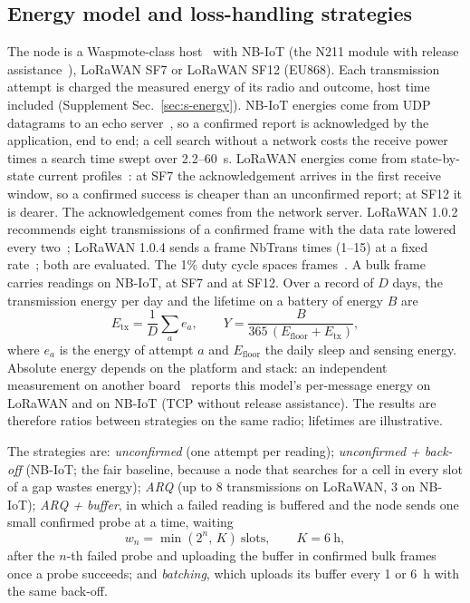 \subsection{Energy model and loss-handling strategies}
\label{sec:data-energy}
The node is a Waspmote-class host~\cite{libelium2020plugsense} with NB-IoT (the N211 module with release assistance~\cite{michelinakis2021dissecting}), LoRaWAN SF7 or LoRaWAN SF12 (EU868). Each transmission attempt is charged the measured energy of its radio and outcome, host time included (Supplement Sec.~\ref{sec:s-energy}). NB-IoT energies come from UDP datagrams to an echo server~\cite{michelinakis2021dissecting}, so a confirmed report is acknowledged by the application, end to end; a cell search without a network costs the receive power~\cite{sorensen2022nbiot} times a search time swept over 2.2--60~s. LoRaWAN energies come from state-by-state current profiles~\cite{casals2017lorawan}: at SF7 the acknowledgement arrives in the first receive window, so a confirmed success is cheaper than an unconfirmed report; at SF12 it is dearer. The acknowledgement comes from the network server. LoRaWAN 1.0.2 recommends eight transmissions of a confirmed frame with the data rate lowered every two~\cite{lora2016spec102}; LoRaWAN 1.0.4 sends a frame NbTrans times (1--15) at a fixed rate~\cite{lora2020spec104}; both are evaluated. The 1\% duty cycle spaces frames~\cite{lora2021rp002}. A bulk frame carries \rpfNb{} readings on NB-IoT, \rpfSfSeven{} at SF7 and \rpfSfTwelve{} at SF12. Over a record of $D$ days, the transmission energy per day and the lifetime on a battery of energy $B$ are
\begin{equation}
E_\mathrm{tx}=\frac{1}{D}\sum_{a} e_a,\qquad Y=\frac{B}{365\,(E_\mathrm{floor}+E_\mathrm{tx})},
\label{eq:energy}
\end{equation}
where $e_a$ is the energy of attempt $a$ and $E_\mathrm{floor}$ the daily sleep and sensing energy. Absolute energy depends on the platform and stack: an independent measurement on another board~\cite{ugwuanyi2021developing} reports \ugwLoraRatio{} this model's per-message energy on LoRaWAN and \ugwNbRatio{} on NB-IoT (TCP without release assistance). The results are therefore ratios between strategies on the same radio; lifetimes are illustrative.

The strategies are: \emph{unconfirmed} (one attempt per reading); \emph{unconfirmed + back-off} (NB-IoT; the fair baseline, because a node that searches for a cell in every slot of a gap wastes energy); \emph{ARQ} (up to 8 transmissions on LoRaWAN, 3 on NB-IoT); \emph{ARQ + buffer}, in which a failed reading is buffered and the node sends one small confirmed probe at a time, waiting
\begin{equation}
w_n=\min\left(2^{n},\,K\right)\ \text{slots},\qquad K=6~\text{h},
\label{eq:backoff}
\end{equation}
after the $n$-th failed probe and uploading the buffer in confirmed bulk frames once a probe succeeds; and \emph{batching}, which uploads its buffer every 1 or 6~h with the same back-off.

